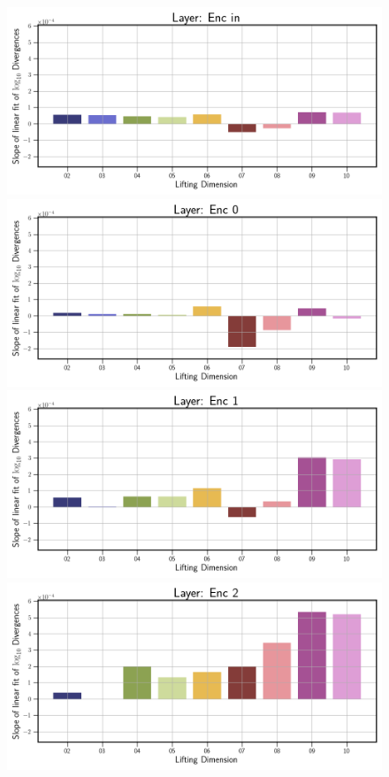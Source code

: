 \begin{figure}[!htbp]
    \centering
    \begin{minipage}{.5\textwidth}
        \includegraphics[width=\textwidth]{"../Figures/duffing_slope_linear_fit_enc_in.png"} 
        \includegraphics[width=\textwidth]{"../Figures/duffing_slope_linear_fit_enc_0.png"} 
        \includegraphics[width=\textwidth]{"../Figures/duffing_slope_linear_fit_enc_1.png"} 
        \includegraphics[width=\textwidth]{"../Figures/duffing_slope_linear_fit_enc_2.png"} 

\end{minipage}
\end{figure}
